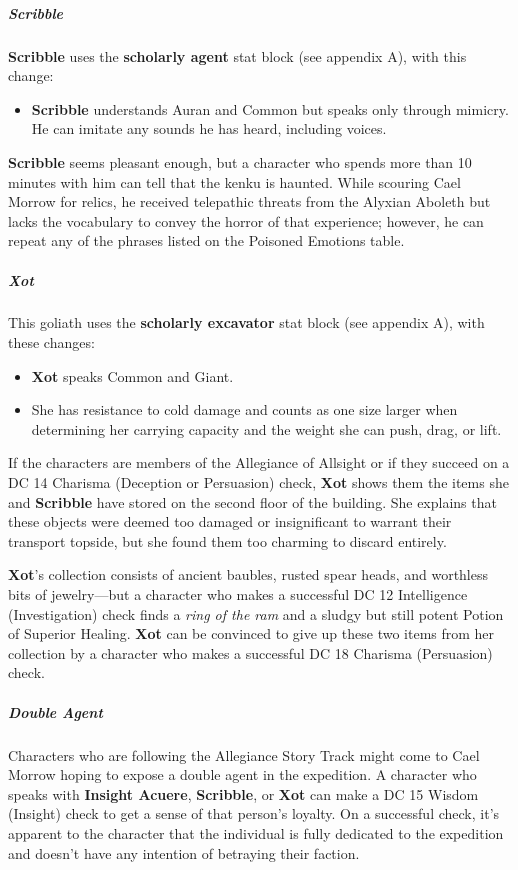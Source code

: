 \documentclass[10pt,a4paper,twoside,fancy,bg=print,twocolumn,openany,nodeprecatedcode]{dndbook}
\begin{document}
\subparagraph{Scribble}
\textbf{Scribble} uses the \textbf{scholarly agent} stat block (see appendix A), with this change:


\begin{itemize}
\item \textbf{Scribble} understands Auran and Common but speaks only through mimicry. He can imitate any sounds he has heard, including voices.
\end{itemize}

\textbf{Scribble} seems pleasant enough, but a character who spends more than 10 minutes with him can tell that the kenku is haunted. While scouring Cael Morrow for relics, he received telepathic threats from the Alyxian Aboleth but lacks the vocabulary to convey the horror of that experience; however, he can repeat any of the phrases listed on the Poisoned Emotions table.

\subparagraph{Xot}
This goliath uses the \textbf{scholarly excavator} stat block (see appendix A), with these changes:


\begin{itemize}
\item \textbf{Xot} speaks Common and Giant.
\item She has resistance to cold damage and counts as one size larger when determining her carrying capacity and the weight she can push, drag, or lift.
\end{itemize}

If the characters are members of the Allegiance of Allsight or if they succeed on a DC 14 Charisma (Deception or Persuasion) check, \textbf{Xot} shows them the items she and \textbf{Scribble} have stored on the second floor of the building. She explains that these objects were deemed too damaged or insignificant to warrant their transport topside, but she found them too charming to discard entirely.

\textbf{Xot}'s collection consists of ancient baubles, rusted spear heads, and worthless bits of jewelry—but a character who makes a successful DC 12 Intelligence (Investigation) check finds a \textit{ring of the ram} and a sludgy but still potent Potion of Superior Healing. \textbf{Xot} can be convinced to give up these two items from her collection by a character who makes a successful DC 18 Charisma (Persuasion) check.

\subparagraph{Double Agent}
Characters who are following the Allegiance Story Track might come to Cael Morrow hoping to expose a double agent in the expedition. A character who speaks with \textbf{Insight Acuere}, \textbf{Scribble}, or \textbf{Xot} can make a DC 15 Wisdom (Insight) check to get a sense of that person's loyalty. On a successful check, it's apparent to the character that the individual is fully dedicated to the expedition and doesn't have any intention of betraying their faction.
\end{document}
